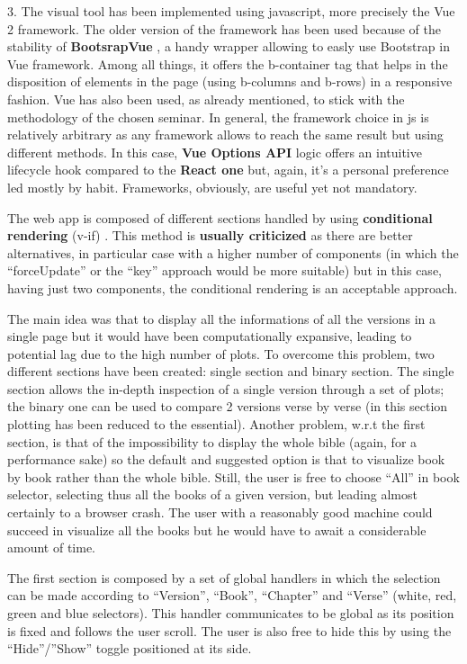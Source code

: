 \documentclass[sigchi]{article}
\begin{document}
3. The visual tool has been implemented using javascript, more precisely the Vue 2 framework. The older version of the framework has been used because of the stability of \textbf{BootsrapVue} \cite{bootstrapvue}, a handy wrapper allowing to easly use Bootstrap in Vue framework. Among all things, it offers the b-container tag that helps in the disposition of elements in the page (using b-columns and b-rows) in a responsive fashion. Vue has also been used, as already mentioned, to stick with the methodology of the chosen seminar. In general, the framework choice in js is relatively arbitrary as any framework allows to reach the same result but using different methods. In this case, \textbf{Vue Options API} \cite{vueapi} logic offers an intuitive lifecycle hook compared to the \textbf{React one} \cite{reactapi} but, again, it’s a personal preference led mostly by habit. Frameworks, obviously, are useful yet not mandatory.

The web app is composed of different sections handled by using \textbf{conditional rendering} (v-if) \cite{vueconditional}. This method is \textbf{usually criticized} \cite{vuewarning} as there are better alternatives, in particular case with a higher number of components (in which the “forceUpdate” or the “key” approach would be more suitable) but in this case, having just two components, the conditional rendering is an acceptable approach.

The main idea was that to display all the informations of all the versions in a single page but it would have been computationally expansive, leading to potential lag due to the high number of plots. To overcome this problem, two different sections have been created: single section and binary section.
The single section allows the in-depth inspection of a single version through a set of plots; the binary one can be used to compare 2 versions verse by verse (in this section plotting has been reduced to the essential).
Another problem, w.r.t the first section, is that of the impossibility to display the whole bible (again, for a performance sake) so the default and suggested option is that to visualize book by book rather than the whole bible. Still, the user is free to choose “All” in book selector, selecting thus all the books of a given version, but leading almost certainly to a browser crash. The user with a reasonably good machine could succeed in visualize all the books but he would have to await a considerable amount of time.

The first section is composed by a set of global handlers in which the selection can be made according to “Version”, “Book”, “Chapter” and “Verse” (white, red, green and blue selectors). This handler communicates to be global as its position is fixed and follows the user scroll. The user is also free to hide this by using the “Hide”/”Show” toggle positioned at its side. 
\end{document}
